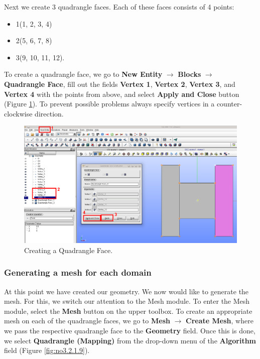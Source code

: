 Next we create 3 quadrangle faces. Each of these faces consists of 4 points:
\begin{itemize}
 \item 1(1, 2, 3, 4)
 \item 2(5, 6, 7, 8)
 \item 3(9, 10, 11, 12).
\end{itemize}

To create a quadrangle face, we go to \textbf{New Entity} $\rightarrow$ \textbf{Blocks} $\rightarrow$ \textbf{Quadrangle Face}, fill out the fields \textbf{Vertex 1}, \textbf{Vertex 2}, \textbf{Vertex 3}, and \textbf{Vertex 4} with the points from above, and select \textbf{Apply and Close} button (Figure \ref{fig:no3.2.1.7}). To prevent possible problems always specify vertices in a counter-clockwise direction.

\begin{figure}[h!]
\begin{center}
\includegraphics[scale=0.4]{figures/SalomeStep2.png}
\caption{Creating a Quadrangle Face.}
\label{fig:no3.2.1.7}
\end{center}
\end{figure}

\subsubsection{Generating a mesh for each domain}

At this point we have created our geometry. We now would like to generate the mesh. For this, we switch our attention to the Mesh module. To enter the Mesh module, select the \textbf{Mesh} button on the upper toolbox. To create an appropriate mesh on each of the quadrangle faces, we go to \textbf{Mesh} $\rightarrow$ \textbf{Create Mesh}, where we pass the respective quadrangle face to the \textbf{Geometry} field. Once this is done, we select \textbf{Quadrangle (Mapping)} from the drop-down menu of the \textbf{Algorithm} field (Figure \ref{fig:no3.2.1.9}).

